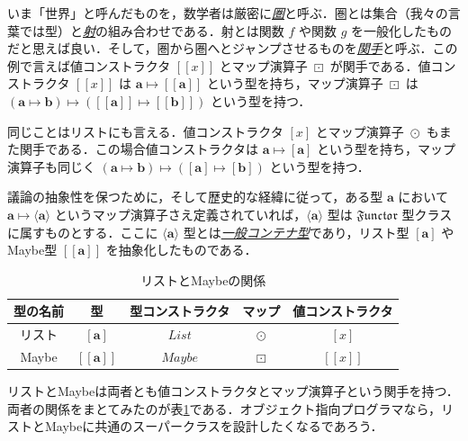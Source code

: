 \documentclass[a4paper]{jsbook}
\def\[{\left[\!\left[}
\def\]{\right]\!\right]}
\newcommand{\keyword}[1]{{\underline{\emph{#1}}}}
\newcommand{\mListWith}[1]{\left[#1\right]}
\newcommand{\mMaybeWith}[1]{\[#1\]}
\newcommand{\mPureWith}[1]{\langle#1\rangle}
\newcommand{\mType}[1]{\mathbf{#1}}
\newcommand{\mListType}[1]{\mListWith{\mType{#1}}}
\newcommand{\mMaybeType}[1]{\mMaybeWith{\mType{#1}}}
\newcommand{\mPureType}[1]{\mPureWith{\mType{#1}}}
\newcommand{\mTypeConstructor}[1]{\mathit{#1}} %
\newcommand{\mSpecialTypeClass}[1]{\mathfrak{#1}} %
\newcommand{\mFunctorTypeClass}{\mSpecialTypeClass{Functor}}
\DeclareMathOperator{\mMapsTo}{\mapsto}
\DeclareMathOperator{\mMapList}{\odot}
\DeclareMathOperator{\mMapMaybe}{\boxdot}
\DeclareMathOperator{\mListTypeConstructor}{\mTypeConstructor{List}}
\DeclareMathOperator{\mMaybeTypeConstructor}{\mTypeConstructor{Maybe}}
\newcommand{\mProj}[2]{#1\mMapsTo#2}
\begin{document}
いま「世界」と呼んだものを，数学者は厳密に\keyword{圏}と呼ぶ．圏とは集合（我々の言葉では型）と\keyword{射}の組み合わせである．射とは関数 $f$ や関数 $g$ を一般化したものだと思えば良い．そして，圏から圏へとジャンプさせるものを\keyword{関手}と呼ぶ．この例で言えば値コンストラクタ $\mMaybeWith{x}$ とマップ演算子 $\mMapMaybe$ が関手である．値コンストラクタ $\mMaybeWith{x}$ は $\mProj{\mType{a}}{\mMaybeType{a}}$ という型を持ち，マップ演算子 $\mMapMaybe$ は $\mProj{(\mProj{\mType{a}}{\mType{b}})}{(\mProj{\mMaybeType{a}}{\mMaybeType{b}})}$ という型を持つ．

同じことはリストにも言える．値コンストラクタ $\mListWith{x}$ とマップ演算子 $\mMapList$ もまた関手である．この場合値コンストラクタは $\mProj{\mType{a}}{\mListType{a}}$ という型を持ち，マップ演算子も同じく $\mProj{(\mProj{\mType{a}}{\mType{b}})}{(\mProj{\mListType{a}}{\mListType{b}})}$ という型を持つ．

議論の抽象性を保つために，そして歴史的な経緯に従って，ある型 $\mType{a}$ において $\mProj{\mType{a}}{\mPureType{a}}$ というマップ演算子さえ定義されていれば，$\mPureType{a}$ 型は $\mFunctorTypeClass$ 型クラスに属すものとする．ここに $\mPureType{a}$ 型とは\keyword{一般コンテナ型}であり，リスト型 $\mListType{a}$ やMaybe型 $\mMaybeType{a}$ を抽象化したものである． 


\begin{table}
\label{tab:list-and-maybe}
\caption{リストとMaybeの関係}
\begin{center}
\begin{tabular}{||c|c|c|c|c||}\hline
型の名前&型&型コンストラクタ&マップ&値コンストラクタ\\\hline\hline
リスト&$\mListType{a}$&$\mListTypeConstructor$&$\mMapList$&$\mListWith{x}$\\
Maybe&$\mMaybeType{a}$&$\mMaybeTypeConstructor$&$\mMapMaybe$&$\mMaybeWith{x}$\\\hline
\end{tabular}
\end{center}
\end{table}


リストとMaybeは両者とも値コンストラクタとマップ演算子という関手を持つ．両者の関係をまとてみたのが表\ref{tab:list-and-maybe}である．オブジェクト指向プログラマなら，リストとMaybeに共通のスーパークラスを設計したくなるであろう．
\end{document}
